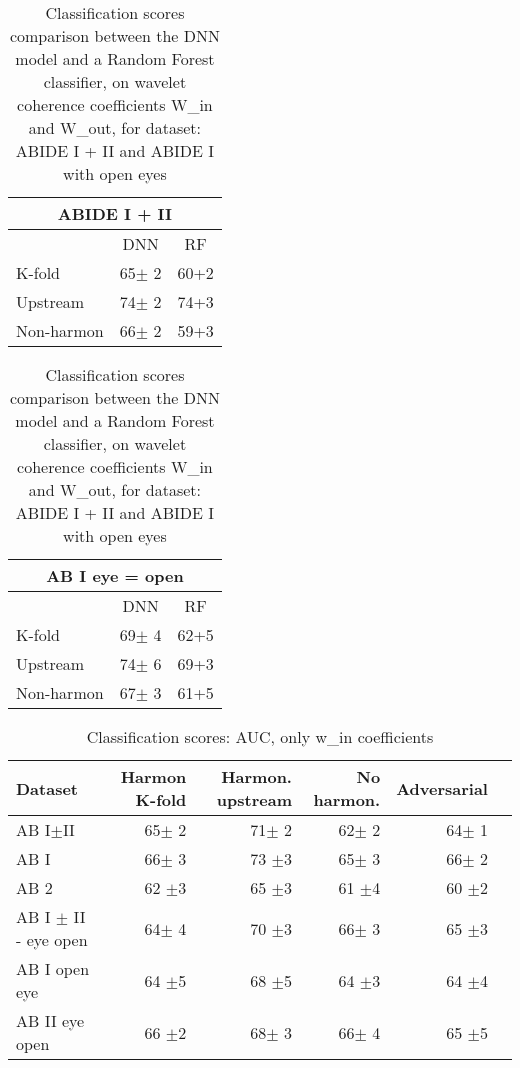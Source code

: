 \documentclass[11pt]{report}
\begin{document}
\begin{table}[h]
    \begin{subtable}[h]{0.45\textwidth}
        \centering
        \begin{tabular}{|lcc|}\toprule
        \multicolumn{3}{|c|}{ABIDE I + II} \\\midrule
        &DNN &RF \\
        K-fold &65$\pm$ 2 &60+2 \\
        Upstream &74$\pm$ 2 &74+3 \\
        Non-harmon &66$\pm$ 2 &59+3 \\
        \bottomrule
        \end{tabular}
    \end{subtable}
   \begin{subtable}[h]{0.45\textwidth}
       \centering
       \begin{tabular}{|lcc|}\toprule
       \multicolumn{3}{|c|}{AB I eye = open} \\\midrule
       &DNN &RF \\
       K-fold &69$\pm$ 4 &62+5 \\
       Upstream &74$\pm$ 6 &69+3 \\
       Non-harmon &67$\pm$ 3 &61+5 \\
       \bottomrule
       \end{tabular}
    \end{subtable}
    \caption{Classification scores comparison between the DNN model and a Random Forest classifier, on wavelet coherence coefficients W\_in and W\_out, for dataset: ABIDE I + II and ABIDE I with open eyes}
    \label{tab:comparison_dnn_rf_win+wout}
\end{table}
\newpage




\begin{table}[!htp]\centering
\scriptsize
\begin{tabular}{lrrrrr}\toprule
Dataset &Harmon K-fold &Harmon. upstream &No harmon. &Adversarial \\\midrule
AB I$\pm$II &65$\pm$ 2 &71$\pm$ 2 &62$\pm$ 2 &64$\pm$ 1 \\
AB I &66$\pm$ 3 &73 $\pm$3 &65$\pm$ 3 &66$\pm$ 2 \\
AB 2 &62 $\pm$3 &65 $\pm$3 &61 $\pm$4 &60 $\pm$2 \\
AB I $\pm$ II - eye open &64$\pm$ 4 &70 $\pm$3 &66$\pm$ 3 &65 $\pm$3 \\
AB I open eye &64 $\pm$5 &68 $\pm$5 &64 $\pm$3 &64 $\pm$4 \\
AB II eye open &66 $\pm$2 &68$\pm$ 3 &66$\pm$ 4 &65 $\pm$5 \\
\bottomrule
\end{tabular}
\caption{Classification scores: AUC, only w\_in coefficients}\label{tab:classification_win}

\end{table}
\end{document}
